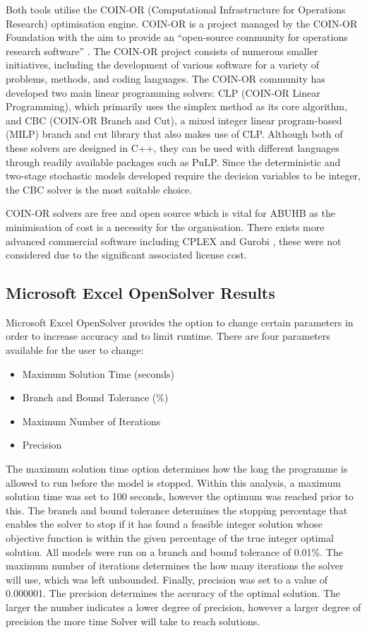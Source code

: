 \documentclass[../thesis.tex]{subfiles}
\begin{document}
Both tools utilise the COIN-OR (Computational Infrastructure for Operations Research) 
optimisation engine. COIN-OR is a project managed by the COIN-OR Foundation with the aim to provide an ``open-source community for operations research software'' \cite{COF2016, LougeeHeimer2003}. The COIN-OR project consists of numerous smaller initiatives, including the development of various software for a variety of problems, methods, and coding languages. The COIN-OR community has developed two main linear programming solvers: CLP (COIN-OR Linear Programming), which primarily uses the simplex method as its core algorithm, and CBC (COIN-OR Branch and Cut), a mixed integer linear program-based (MILP) branch and cut library that also makes use of CLP. Although both of these solvers are designed in C++, they can be used with different languages through readily available packages such as PuLP. Since the deterministic and two-stage stochastic models developed require the decision variables to be integer, the CBC solver is the most suitable choice.

COIN-OR solvers are free and open source which is vital for ABUHB as the minimisation of cost is a necessity for the organisation. There exists more advanced commercial software including CPLEX \cite{IBM} and Gurobi \cite{GurobiOptimization}, these were not considered due to the significant associated license cost. 

\subsection{Microsoft Excel OpenSolver Results}\label{sec:opensolverresult}
Microsoft Excel OpenSolver provides the option to change certain parameters in order to increase accuracy and to limit runtime. There are four parameters available for the user to change:
\begin{itemize}
    \item Maximum Solution Time (seconds)
    \item Branch and Bound Tolerance (\%)
    \item Maximum Number of Iterations
    \item Precision
\end{itemize}

The maximum solution time option determines how the long the programme is allowed to run before the model is stopped. Within this analysis, a maximum solution time was set to 100 seconds, however the optimum was reached prior to this. The branch and bound tolerance determines the stopping percentage that enables the solver to stop if it has found a feasible integer solution whose objective function is within the given percentage of the true integer optimal solution. All models were run on a branch and bound tolerance of 0.01\%. The maximum number of iterations determines the how many iterations the solver will use, which was left unbounded. Finally, precision was set to a value of 0.000001. The precision determines the accuracy of the optimal solution. The larger the number indicates a lower degree of precision, however a larger degree of precision the more time Solver will take to reach solutions.
\end{document}
